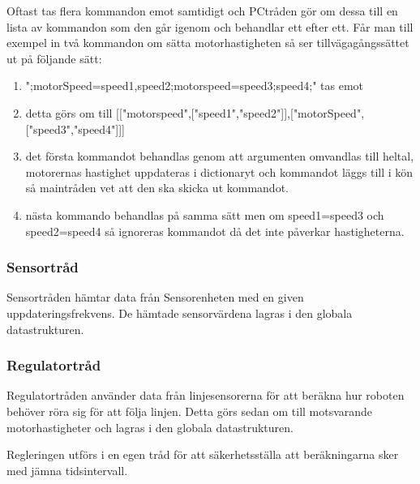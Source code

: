 Oftast tas flera kommandon emot samtidigt och PCtråden gör om dessa till en lista av kommandon som den går igenom och behandlar ett efter ett. Får man till exempel in två kommandon om sätta motorhastigheten så ser tillvägagångssättet ut på följande sätt:
\begin{enumerate}
\item ";motorSpeed=speed1,speed2;motorspeed=speed3;speed4;" tas emot
\item detta görs om till [["motorspeed",["speed1","speed2"]],["motorSpeed",["speed3","speed4"]]]
\item det första kommandot behandlas genom att argumenten omvandlas till heltal, motorernas hastighet uppdateras i dictionaryt och kommandot läggs till i kön så maintråden vet att den ska skicka ut kommandot.
\item nästa kommando behandlas på samma sätt men om speed1=speed3 och speed2=speed4 så ignoreras kommandot då det inte påverkar hastigheterna. 
\end{enumerate}

\subsubsection{Sensortråd}
Sensortråden hämtar data från Sensorenheten med en given uppdateringsfrekvens. De hämtade sensorvärdena lagras i den globala datastrukturen.

\subsubsection{Regulatortråd}
Regulatortråden använder data från linjesensorerna för att beräkna hur roboten behöver röra sig för att följa linjen. Detta görs sedan om till motsvarande motorhastigheter och lagras i den globala datastrukturen.

Regleringen utförs i en egen tråd för att säkerhetsställa att beräkningarna sker med jämna tidsintervall.

